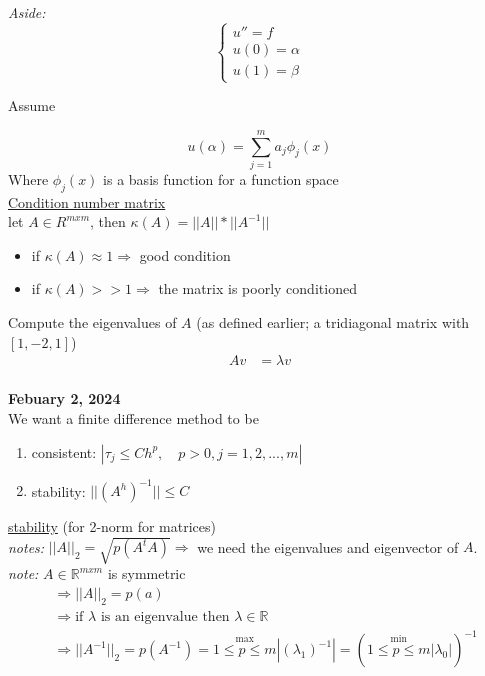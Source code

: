 \documentclass[10pt]{article}
\newcommand{\ds}{\displaystyle}
\newcommand{\R}{\mathbb{R}}
\begin{document}
\textit{Aside:}\\
\[\begin{cases}
u'' = f\\
u(0) = \alpha\\
u(1) = \beta
\end{cases}\]

Assume

\[u(\alpha) = \sum_{j=1}^m a_j \phi_j(x)\]
Where $\phi_j(x)$ is a basis function for a function space\\

\underline{Condition number matrix}\\

let $A \in R^{mxm}$, then $\kappa(A) = ||A|| * ||A^{-1}||$\\
\begin{itemize}
    \item if $\kappa(A) \approx 1 \Rightarrow$ good condition
    \item if $\kappa(A) >> 1 \Rightarrow$ the matrix is poorly conditioned
\end{itemize}

Compute the eigenvalues of $A$ (as defined earlier; a tridiagonal matrix with $[1,-2,1]$)\\
\begin{align*}
Av &= \lambda v\\
\end{align*}

\textbf{Febuary 2, 2024}\\
We want a finite difference method to be
\begin{enumerate}
\item consistent: $|\tau_j \leq Ch^p, \quad p > 0, j = 1,2,...,m|$
\item stability: $||(A^h)^{-1}|| \leq C$
\end{enumerate}

\underline{stability} (for 2-norm for matrices)\\

\textit{notes:} $||A||_2 = \sqrt{p(A^tA)} \Rightarrow$ we need the eigenvalues and eigenvector of $A$.\\
\textit{note:} $A \in \R^{mxm}$ is symmetric\\
\begin{align*}
    &\Rightarrow ||A||_2 = p(a)\\
    &\Rightarrow \text{if } \lambda \text{ is an eigenvalue then } \lambda \in \R\\
    &\Rightarrow ||A^{-1}||_2 = p(A^{-1}) = \overset{\ds \text{max}}{1 \leq p \leq m} |(\lambda_1)^{-1}| = (\overset{\ds \text{min}}{1 \leq p \leq m} |\lambda_0|)^{-1}
\end{align*}
\end{document}
